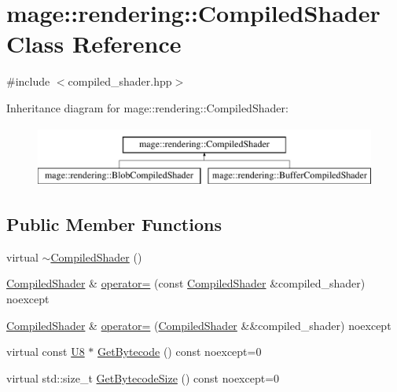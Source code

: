 \hypertarget{classmage_1_1rendering_1_1_compiled_shader}{}\section{mage\+:\+:rendering\+:\+:Compiled\+Shader Class Reference}
\label{classmage_1_1rendering_1_1_compiled_shader}


{\ttfamily \#include $<$compiled\+\_\+shader.\+hpp$>$}

Inheritance diagram for mage\+:\+:rendering\+:\+:Compiled\+Shader\+:\begin{figure}[H]
\begin{center}
\leavevmode
\includegraphics[height=2.000000cm]{classmage_1_1rendering_1_1_compiled_shader}
\end{center}
\end{figure}
\subsection*{Public Member Functions}
\begin{DoxyCompactItemize}
\item 
virtual \mbox{\hyperlink{classmage_1_1rendering_1_1_compiled_shader_abb17672237a99552beef603cd1d4f680}{$\sim$\+Compiled\+Shader}} ()
\item 
\mbox{\hyperlink{classmage_1_1rendering_1_1_compiled_shader}{Compiled\+Shader}} \& \mbox{\hyperlink{classmage_1_1rendering_1_1_compiled_shader_a1981d885693b7849078f509f15b81071}{operator=}} (const \mbox{\hyperlink{classmage_1_1rendering_1_1_compiled_shader}{Compiled\+Shader}} \&compiled\+\_\+shader) noexcept
\item 
\mbox{\hyperlink{classmage_1_1rendering_1_1_compiled_shader}{Compiled\+Shader}} \& \mbox{\hyperlink{classmage_1_1rendering_1_1_compiled_shader_ab4217b5b68c5cc33b6736a844ddfe699}{operator=}} (\mbox{\hyperlink{classmage_1_1rendering_1_1_compiled_shader}{Compiled\+Shader}} \&\&compiled\+\_\+shader) noexcept
\item 
virtual const \mbox{\hyperlink{namespacemage_a30677c03d683c4c35630c25f6ff3fb7f}{U8}} $\ast$ \mbox{\hyperlink{classmage_1_1rendering_1_1_compiled_shader_a469367d98fe910537a02868df0c85ec4}{Get\+Bytecode}} () const noexcept=0
\item 
virtual std\+::size\+\_\+t \mbox{\hyperlink{classmage_1_1rendering_1_1_compiled_shader_a8e574ddc7247689426cc15c6c6d416f8}{Get\+Bytecode\+Size}} () const noexcept=0
\end{DoxyCompactItemize}
